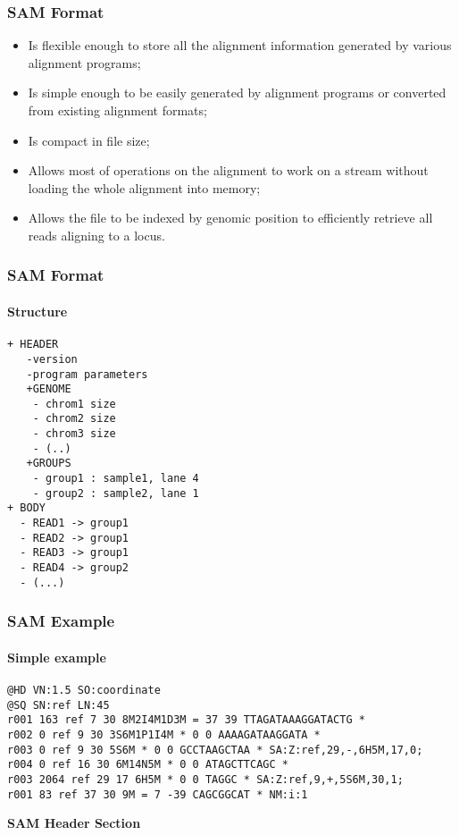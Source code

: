 \documentclass{beamer}
\newcommand{\centeredtitle}[1]{
\begin{center}
    \Huge{\bf{#1}}
\end{center}
}
\newcommand{\hugeslide}[1]{
\begin{frame}
\centeredtitle{#1}
\end{frame}
}
\begin{document}
\begin{frame}[fragile]
\frametitle{SAM Format}
\begin{itemize}
\item Is flexible enough to store all the alignment information generated by various alignment programs;
\item Is simple enough to be easily generated by alignment programs or converted from existing alignment formats;
\item Is compact in file size;
\item Allows most of operations on the alignment to work on a stream without loading the whole alignment into memory;
\item Allows the file to be indexed by genomic position to efficiently retrieve all reads aligning to a locus. 
\end{itemize}
\end{frame}



\begin{frame}[fragile]
\frametitle{SAM Format}
\framesubtitle{Structure}
\begin{verbatim}
+ HEADER
   -version
   -program parameters
   +GENOME
   	- chrom1 size
   	- chrom2 size
   	- chrom3 size
   	- (..)
   +GROUPS
   	- group1 : sample1, lane 4
   	- group2 : sample2, lane 1
+ BODY
  - READ1 -> group1
  - READ2 -> group1
  - READ3 -> group1
  - READ4 -> group2
  - (...)
\end{verbatim}
\end{frame}


\begin{frame}[fragile]
\frametitle{SAM Example}
\framesubtitle{Simple example}
\begin{framed}\tiny
\begin{verbatim}
@HD VN:1.5 SO:coordinate
@SQ SN:ref LN:45
r001 163 ref 7 30 8M2I4M1D3M = 37 39 TTAGATAAAGGATACTG *
r002 0 ref 9 30 3S6M1P1I4M * 0 0 AAAAGATAAGGATA *
r003 0 ref 9 30 5S6M * 0 0 GCCTAAGCTAA * SA:Z:ref,29,-,6H5M,17,0;
r004 0 ref 16 30 6M14N5M * 0 0 ATAGCTTCAGC *
r003 2064 ref 29 17 6H5M * 0 0 TAGGC * SA:Z:ref,9,+,5S6M,30,1;
r001 83 ref 37 30 9M = 7 -39 CAGCGGCAT * NM:i:1
\end{verbatim}
\end{framed}
\end{frame}



\hugeslide{SAM Header Section}
\end{document}
